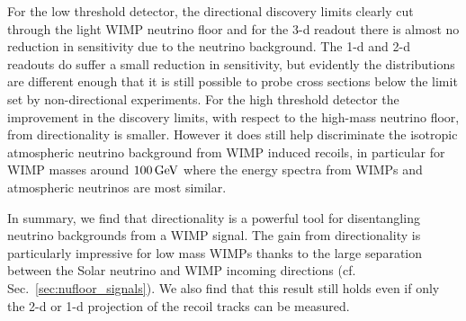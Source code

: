 For the low threshold detector, the directional discovery limits clearly cut through the light WIMP neutrino floor and for the 3-d readout there is almost no reduction in sensitivity due to the neutrino background. The 1-d and 2-d readouts do suffer a small reduction in sensitivity, but evidently the distributions are different enough that it is still possible to probe cross sections below the limit set by non-directional experiments. For the high threshold detector the improvement in the discovery limits, with respect to the high-mass neutrino floor, from directionality is smaller. However it does still help discriminate the isotropic atmospheric neutrino background from WIMP induced recoils, in particular for WIMP masses around $100 \, {\rm GeV}$ where the energy spectra from WIMPs and atmospheric neutrinos are most similar.

In summary, we find that directionality is a powerful tool for disentangling neutrino backgrounds from a WIMP signal. The gain from directionality is particularly impressive for low mass WIMPs thanks to the large separation between the Solar neutrino and WIMP incoming directions (cf. Sec.~\ref{sec:nufloor_signals}). We also find that this result still holds even if only the 2-d or 1-d projection of the recoil tracks can be measured.


